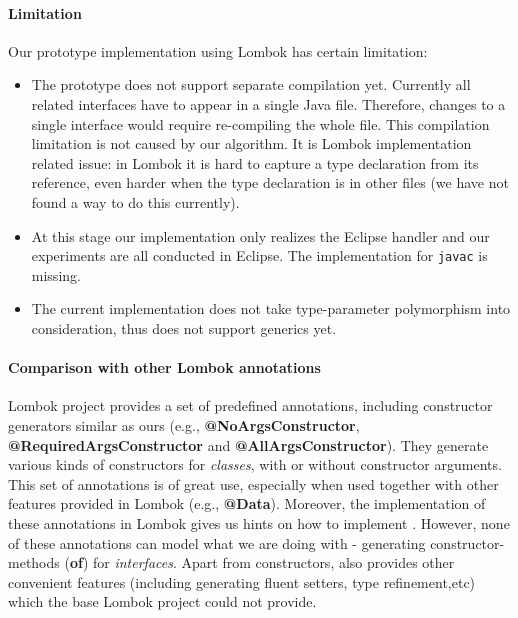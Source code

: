 \paragraph{Limitation}
Our prototype implementation using Lombok has certain limitation: 
\begin{itemize}
\item The prototype does not support separate compilation yet. Currently all
  related interfaces have to appear in a single Java file. Therefore, changes to
  a single interface would require re-compiling the whole file. This compilation
  limitation is not caused by our algorithm. It is Lombok implementation related
  issue: in Lombok it is hard to capture a type declaration from its reference,
  even harder when the type declaration is in other files (we have not found a
  way to do this currently).
\item At this stage our implementation only realizes the Eclipse handler and our
  experiments are all conducted in Eclipse. The implementation for
  \texttt{javac} is missing.
\item The current implementation does not take type-parameter polymorphism into
  consideration, thus does not support generics yet.
\end{itemize}

\paragraph{Comparison with other Lombok annotations}
Lombok project provides a set of predefined annotations, including constructor
generators similar as ours (e.g., \textbf{@NoArgsConstructor},
\textbf{@RequiredArgsConstructor} and \textbf{@AllArgsConstructor}). They
generate various kinds of constructors for \emph{classes}, with or without
constructor arguments. This set of annotations is of great use, especially when
used together with other features provided in Lombok (e.g.,
\textbf{@Data}). Moreover, the implementation of these annotations in Lombok
gives us hints on how to implement \mixin. However, none of these annotations
can model what we are doing with \mixin - generating constructor-methods
(\textbf{of}) for \emph{interfaces}. Apart from constructors, \mixin also
provides other convenient features (including generating fluent setters, type
refinement,etc) which the base Lombok project could not provide.
